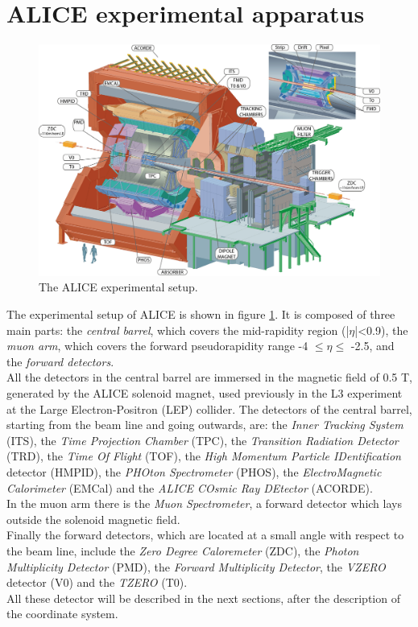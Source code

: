\section{ALICE experimental apparatus}
%
\begin{figure}
  \centering
  \includegraphics[scale=0.55]{figures/ALICEapp.jpg}
  \caption{The ALICE experimental setup.}
  \label{fig:ALICEapp}
\end{figure}
%
The experimental setup of ALICE is shown in figure \ref{fig:ALICEapp}. It is composed of three main parts: the \textit{central barrel}, which covers the mid-rapidity region (|$\eta$|<0.9), the \textit{muon arm}, which covers the forward pseudorapidity range -4 $\leq \eta \leq$ -2.5, and the \textit{forward detectors}.\\
All the detectors in the central barrel are immersed in the magnetic field of 0.5 T, generated by the ALICE solenoid magnet, used previously in the L3 experiment at the Large Electron-Positron (LEP) collider. The detectors of the central barrel, starting from the beam line and going outwards, are: the \textit{Inner Tracking System} (ITS), the \textit{Time Projection Chamber} (TPC), the \textit{Transition Radiation Detector} (TRD), the \textit{Time Of Flight} (TOF), the \textit{High Momentum Particle IDentification} detector (HMPID), the \textit{PHOton Spectrometer} (PHOS), the \textit{ElectroMagnetic Calorimeter} (EMCal) and the \textit{ALICE COsmic Ray DEtector} (ACORDE).\\
In the muon arm there is the \textit{Muon Spectrometer}, a forward detector which lays outside the solenoid magnetic field.\\
Finally the forward detectors, which are located at a small angle with respect to the beam line, include the \textit{Zero Degree Caloremeter} (ZDC), the \textit{Photon Multiplicity Detector} (PMD), the \textit{Forward Multiplicity Detector}, the \textit{VZERO} detector (V0) and the \textit{TZERO} (T0).\\
All these detector will be described in the next sections, after the description of the coordinate system.
